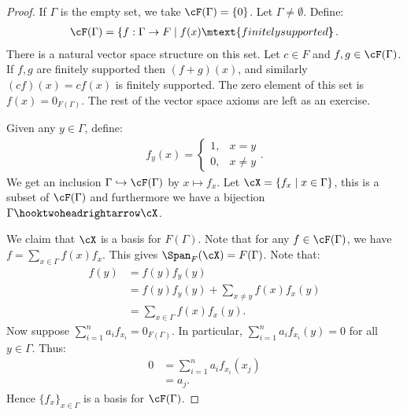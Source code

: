         \begin{proof}
            If $\Gamma$ is the empty set, we take $\cF(\Gamma) = \{0\}$. Let $\Gamma \neq \emptyset$. Define:
                \begin{equation*}
                \begin{split}
                    \cF(\Gamma) = \left\{f:\Gamma \rightarrow F \mid f(x)\mtext{finitely supported}\hspace{-5pt}\right\}.
                \end{split}
                \end{equation*}
            There is a natural vector space structure on this set. Let $c \in F$ and $f,g \in \cF(\Gamma)$. If $f,g$ are finitely supported then $(f+g)(x)$, and similarly $(cf)(x) = cf(x)$ is finitely supported. The zero element of this set is $f(x) = 0_{F(\Gamma)}$. The rest of the vector space axioms are left as an exercise.

            Given any $y \in \Gamma$, define:
                \begin{equation*}
                \begin{split}
                    f_y(x) = \begin{cases} 1, &x = y \\ 0, &x \neq y\end{cases}.
                \end{split}
                \end{equation*}
            We get an inclusion $\Gamma \hookrightarrow \cF(\Gamma)$ by $x \mapsto f_x$. Let $\cX = \{f_x \mid x \in \Gamma\}$, this is a subset of $\cF(\Gamma)$ and furthermore we have a bijection $\Gamma \hooktwoheadrightarrow \cX$.

            We claim that $\cX$ is a basis for $F(\Gamma)$. Note that for any $f \in \cF(\Gamma)$, {\color{red} we have $f = \sum_{x \in \Gamma}f(x)f_x$. This gives $\Span_F(\cX) = F(\Gamma)$.} Note that:
                \begin{equation*}
                \begin{split}
                    f(y)
                    & = f(y)f_y(y) \\
                    & = f(y)f_y(y) + \sum_{x \neq y}f(x)f_x(y) \\
                    & = \sum_{x \in \Gamma}f(x)f_x(y).
                \end{split}
                \end{equation*}
            Now suppose $\sum_{i = 1}^n a_if_{x_i} = 0_{F(\Gamma)}$. In particular, $\sum_{i = 1}^n a_if_{x_i}(y) = 0$ for all $y \in \Gamma$. Thus:
                \begin{equation*}
                \begin{split}
                    0 
                    &= \sum_{i=1}^n a_i f_{x_i}(x_j) \\
                    & = a_j.
                \end{split}
                \end{equation*}
            Hence $\{f_x\}_{x \in \Gamma}$ is a basis for $\cF(\Gamma)$.


\end{proof}
